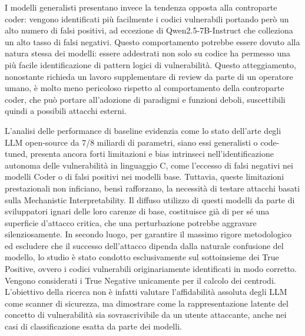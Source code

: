 I modelli generalisti presentano invece la tendenza opposta alla controparte coder: vengono identificati più facilmente i codici vulnerabili portando però un alto numero di falsi positivi, ad eccezione di Qwen2.5-7B-Instruct che colleziona un alto tasso di falsi negativi.
Questo comportamento potrebbe essere dovuto alla natura stessa dei modelli: essere addestrati non solo su codice ha permesso una più facile identificazione di pattern logici di vulnerabilità.
Questo atteggiamento, nonostante richieda un lavoro supplementare di review da parte di un operatore umano, è molto meno pericoloso rispetto al comportamento della controparte coder, che può portare all'adozione di paradigmi e funzioni deboli, suscettibili quindi a possibili attacchi esterni.

L'analisi delle performance di baseline evidenzia come lo stato dell'arte degli LLM open-source da 7/8 miliardi di parametri, siano essi generalisti o code-tuned, presenta ancora forti limitazioni e bias intrinseci nell'identificazione autonoma delle vulnerabilità in linguaggio C, come l'eccesso di falsi negativi nei modelli Coder o di falsi positivi nei modelli base.
Tuttavia, queste limitazioni prestazionali non inficiano, bensì rafforzano, la necessità di testare attacchi basati sulla Mechanistic Interpretability. Il diffuso utilizzo di questi modelli da parte di sviluppatori ignari delle loro carenze di base, costituisce già di per sé una superficie d'attacco critica, che una perturbazione potrebbe aggravare silenziosamente.
In secondo luogo, per garantire il massimo rigore metodologico ed escludere che il successo dell'attacco dipenda dalla naturale confusione del modello, lo studio è stato condotto esclusivamente sul sottoinsieme dei True Positive, ovvero i codici vulnerabili originariamente identificati in modo corretto. Vengono considerati i True Negative unicamente per il calcolo dei centrodi.
L'obiettivo della ricerca non è infatti valutare l'affidabilità assoluta degli LLM come scanner di sicurezza, ma dimostrare come la rappresentazione latente del concetto di vulnerabilità sia sovrascrivibile da un utente attaccante, anche nei casi di classificazione esatta da parte dei modelli.

